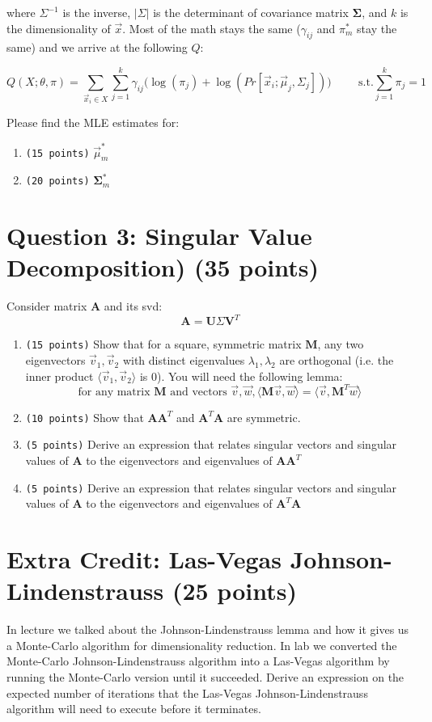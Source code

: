 \documentclass[11pt]{article}
\newcommand{\question}[1]{\section*{\normalsize #1}}
\begin{document}
\noindent where $\Sigma^{-1}$ is the inverse, $|\Sigma|$ is the determinant of covariance matrix $\mathbf{\Sigma}$, and $k$ is the dimensionality of $\vec{x}$. Most of the math stays the same ($\gamma_{ij}$ and $\pi^{*}_m$ stay the same) and we arrive at the following $Q$:

$$Q(X;\theta,\pi) = \sum\limits_{\vec{x}_i\in X} \sum\limits_{j=1}^k \gamma_{ij}\Big(\log(\pi_j) + \log(Pr[\vec{x}_i;\vec{\mu}_j,\Sigma_j])\Big) \hspace{1cm} \text{s.t.} \sum\limits_{j=1}^k \pi_j = 1$$

\noindent Please find the MLE estimates for:
\begin{enumerate}
    \item \texttt{(15 points)} $\vec{\mu}^{*}_m$
    \item \texttt{(20 points)} $\mathbf{\Sigma}^{*}_m$
\end{enumerate}
\newpage











\question{Question 3: Singular Value Decomposition) (35 points)}
Consider matrix $\textbf{A}$ and its svd:
$$\textbf{A} = \textbf{U}\Sigma\textbf{V}^T$$
\begin{enumerate}
    \item \texttt{(15 points)} Show that for a square, symmetric matrix $\textbf{M}$, any two eigenvectors $\vec{v}_1, \vec{v}_2$ with distinct eigenvalues $\lambda_1, \lambda_2$ are orthogonal (i.e. the inner product $\langle \vec{v}_1, \vec{v}_2\rangle$ is 0). You will need the following lemma:
$$\text{for any matrix }\textbf{M}\text{ and vectors }\vec{v}, \vec{w}, \langle \textbf{M}\vec{v}, \vec{w}\rangle = \langle \vec{v}, \textbf{M}^T\vec{w}\rangle$$


    \item \texttt{(10 points)} Show that $\textbf{A}\textbf{A}^T$ and $\textbf{A}^T\textbf{A}$ are symmetric.

    \item \texttt{(5 points)} Derive an expression that relates singular vectors and singular values of $\textbf{A}$ to the eigenvectors and eigenvalues of $\textbf{A}\textbf{A}^T$


    \item \texttt{(5 points)} Derive an expression that relates singular vectors and singular values of $\textbf{A}$ to the eigenvectors and eigenvalues of $\textbf{A}^T\textbf{A}$
\end{enumerate}
\newpage





\question{Extra Credit: Las-Vegas Johnson-Lindenstrauss (25 points)}
In lecture we talked about the Johnson-Lindenstrauss lemma and how it gives us a Monte-Carlo algorithm for dimensionality reduction. In lab we converted the Monte-Carlo Johnson-Lindenstrauss algorithm into a Las-Vegas algorithm by running the Monte-Carlo version until it succeeded. Derive an expression on the expected number of iterations that the Las-Vegas Johnson-Lindenstrauss algorithm will need to execute before it terminates.
\end{document}
